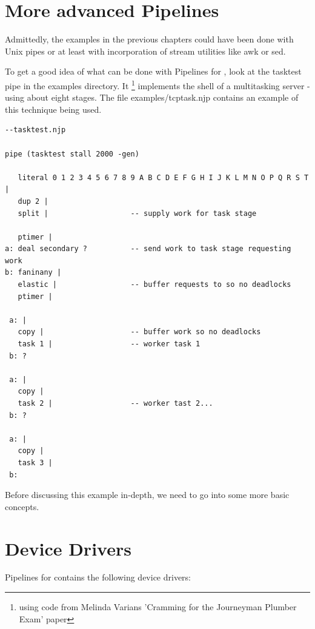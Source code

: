 \chapter{More advanced Pipelines}
Admittedly, the examples in the previous chapters could have been done
with Unix pipes or at least with incorporation of stream utilities
like awk or sed.


To get a good idea of what can be done with Pipelines for \nr{}, look at the tasktest
pipe in the examples directory.  It \footnote{using code from Melinda Varians
'Cramming for the Journeyman Plumber Exam' paper} implements the
shell of a  multitasking server - using about eight stages.  The file
examples/tcptask.njp contains an example of this technique being used.
\begin{lstlisting}
--tasktest.njp

pipe (tasktest stall 2000 -gen)

   literal 0 1 2 3 4 5 6 7 8 9 A B C D E F G H I J K L M N O P Q R S T |
   dup 2 |
   split |                   -- supply work for task stage

   ptimer |
a: deal secondary ?          -- send work to task stage requesting work
b: faninany |
   elastic |                 -- buffer requests to so no deadlocks
   ptimer |

 a: |
   copy |                    -- buffer work so no deadlocks
   task 1 |                  -- worker task 1
 b: ?

 a: |
   copy |
   task 2 |                  -- worker tast 2...
 b: ?

 a: |
   copy |
   task 3 |
 b:
\end{lstlisting}

Before discussing this example in-depth, we need to go into some more
basic concepts.

\chapter{Device Drivers}
\label{ch:devicedrivers}
Pipelines for \nr{} contains the following device drivers:


